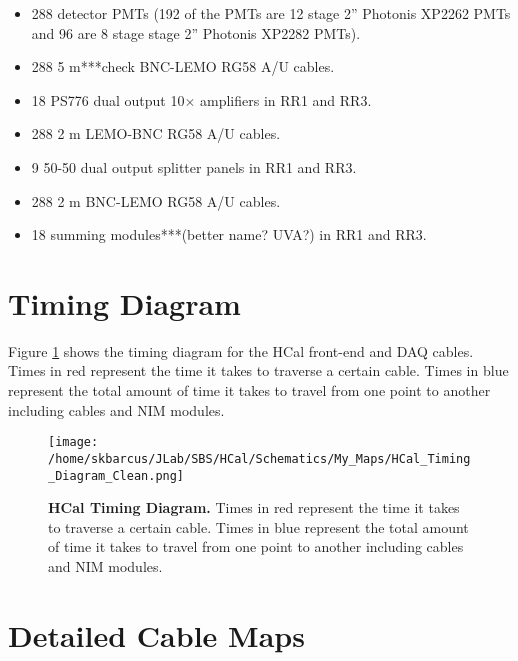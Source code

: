 \documentclass[oneside]{book}   %
\begin{document}
\begin{itemize}\itemsep6pt \parskip0pt 
	\item 288 detector PMTs (192 of the PMTs are 12 stage 2'' Photonis XP2262 PMTs and 96 are 8 stage stage 2'' Photonis XP2282 PMTs).
	\item 288 5 m***check BNC-LEMO RG58 A/U cables. 
	\item 18 PS776 dual output 10$\times$ amplifiers in RR1 and RR3.
	\item 288 2 m LEMO-BNC RG58 A/U cables. 
	\item 9 50-50 dual output splitter panels in RR1 and RR3. 
	\item 288 2 m BNC-LEMO RG58 A/U cables.
	\item 18 summing modules***(better name? UVA?) in RR1 and RR3.
\end{itemize}

\section{Timing Diagram}
\label{sec:timing_diagram}

Figure \ref{fig:timing_diagram} shows the timing diagram for the HCal front-end and DAQ cables. Times in red represent the time it takes to traverse a certain cable. Times in blue represent the total amount of time it takes to travel from one point to another including cables and NIM modules.

	\begin{landscape}
	
	\begin{figure}[!ht]
	\begin{center}
	\texttt{[image: /home/skbarcus/JLab/SBS/HCal/Schematics/My\_Maps/HCal\_Timing\_Diagram\_Clean.png]}
	\end{center}
	\vspace{-5mm}
	\caption{
	{\bf{HCal Timing Diagram.}} Times in red represent the time it takes to traverse a certain cable. Times in blue represent the total amount of time it takes to travel from one point to another including cables and NIM modules.}
	\label{fig:timing_diagram}
	\end{figure}	
	
	\end{landscape}
	\restoregeometry

\section{Detailed Cable Maps}
\label{sec:detailed_cable_maps}
\end{document}

